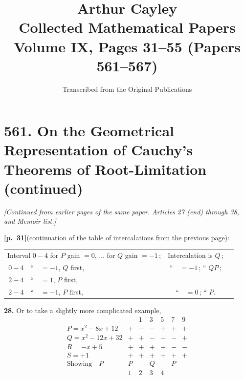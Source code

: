 \documentclass[11pt,a4paper]{article}
\title{\textbf{Arthur Cayley}\\\vspace{0.5em}
\Large Collected Mathematical Papers\\\vspace{0.3em}
\large Volume IX, Pages 31--55 (Papers 561--567)}
\author{Transcribed from the Original Publications}
\date{}
\begin{document}
\maketitle
\thispagestyle{empty}

\tableofcontents
\newpage

\section*{\textbf{561.} On the Geometrical Representation of Cauchy's Theorems of Root-Limitation (continued)}

\textit{[Continued from earlier pages of the same paper. Articles 27 (end) through 38, and Memoir list.]}

\bigskip

\noindent\textbf{[p.~31]}\quad (continuation of the table of intercalations from the previous page):

\smallskip

\begin{center}
\begin{tabular}{lcl}
Interval $0-4$ for $P$ gain $=0$, $\ldots$ for $Q$ gain $=-1$\,; & Intercalation is $Q$\,; \\
$\,$$0-4$\quad $\,\,\,\,$ ``\quad $\,\,\,\,$ $=-1$, $Q$ first, & ``\quad $\,\,\,\,$ $=-1$\,; \quad`` \quad $QP$\,; \\
$\,$$2-4$\quad $\,\,\,\,$ ``\quad $\,\,\,\,$ $=1$, $P$ first, & \\
$\,$$2-4$\quad $\,\,\,\,$ ``\quad $\,\,\,\,$ $=-1$, $P$ first, & ``\quad $\,\,\,\,$ $=0$\,; \quad`` \quad $P$.
\end{tabular}
\end{center}

\medskip

\noindent\textbf{28.} Or to take a slightly more complicated example,
\[
\begin{array}{l|cccccc}
                       &   & 1 & 3 & 5 & 7 & 9 \\\hline
P = x^{2} - 8x + 12    & + & - & - & + & + & + \\
Q = x^{2} - 12x + 32   & + & + & - & - & - & + \\
R = -x + 5             & + & + & + & + & - & - \\
S = +1                 & + & + & + & + & + & + \\\hline
\text{Showing}\quad P  & P &   & Q &   & P &   \\
                       & 1 & 2 & 3 & 4 &   &   \\
\end{array}
\]
\end{document}
